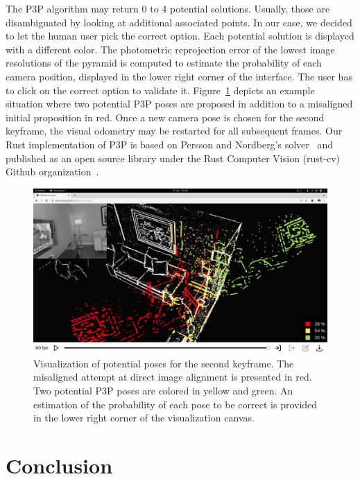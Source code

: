 The P3P algorithm may return 0 to 4 potential solutions.
Usually, those are disambiguated by looking at additional associated points.
In our case, we decided to let the human user pick the correct option.
Each potential solution is displayed with a different color.
The photometric reprojection error of the lowest image resolutions of the pyramid
is computed to estimate the probability of each camera position,
displayed in the lower right corner of the interface.
The user has to click on the correct option to validate it.
Figure~\ref{fig:p3p-two-poses} depicts an example situation where two potential
P3P poses are proposed in addition to a misaligned initial proposition in red.
Once a new camera pose is chosen for the second keyframe,
the visual odometry may be restarted for all subsequent frames.
Our Rust implementation of P3P is based on Persson and Nordberg's solver~\cite{persson2018lambda}
and published as an open source library under the Rust Computer Vision (rust-cv)
Github organization~\cite{rust-p3p}.

\begin{figure}[t]
	\centering
	\includegraphics[width=\linewidth]{assets/img/p3p-two.png}
	\caption{Visualization of potential poses for the second keyframe.
	The misaligned attempt at direct image alignment is presented in red.
	Two potential P3P poses are colored in yellow and green.
	An estimation of the probability of each pose to be correct is
	provided in the lower right corner of the visualization canvas.}%
	\label{fig:p3p-two-poses}
\end{figure}

\section{Conclusion}%
\label{sec:vors-ccl}

